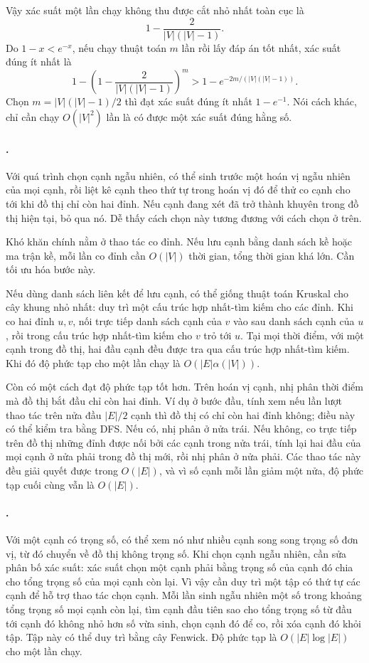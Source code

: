 \documentclass[11pt]{article}
\begin{document}
Vậy xác suất một lần chạy không thu được cắt nhỏ nhất toàn cục là
\[
  1-\frac{2}{|V|(|V|-1)}.
\]
Do \(1-x<e^{-x}\), nếu chạy thuật toán \(m\) lần rồi lấy đáp án tốt nhất, xác
suất đúng ít nhất là
\[
  1-\left(1-\frac{2}{|V|(|V|-1)}\right)^m
  > 1-e^{-2m/(|V|(|V|-1))}.
\]
Chọn \(m=|V|(|V|-1)/2\) thì đạt xác suất đúng ít nhất \(1-e^{-1}\). Nói cách
khác, chỉ cần chạy \(O(|V|^2)\) lần là có được một xác suất đúng hằng số.

\paragraph{.}
Với quá trình chọn cạnh ngẫu nhiên, có thể sinh trước một hoán vị ngẫu nhiên
của mọi cạnh, rồi liệt kê cạnh theo thứ tự trong hoán vị đó để thử co cạnh
cho tới khi đồ thị chỉ còn hai đỉnh. Nếu cạnh đang xét đã trở thành khuyên
trong đồ thị hiện tại, bỏ qua nó. Dễ thấy cách chọn này tương đương với cách
chọn ở trên.

Khó khăn chính nằm ở thao tác co đỉnh. Nếu lưu cạnh bằng danh sách kề hoặc ma
trận kề, mỗi lần co đỉnh cần \(O(|V|)\) thời gian, tổng thời gian khá lớn. Cần
tối ưu hóa bước này.

Nếu dùng danh sách liên kết để lưu cạnh, có thể giống thuật toán Kruskal cho
cây khung nhỏ nhất: duy trì một cấu trúc hợp nhất-tìm kiếm cho các đỉnh. Khi
co hai đỉnh \(u,v\), nối trực tiếp danh sách cạnh của \(v\) vào sau danh sách
cạnh của \(u\), rồi trong cấu trúc hợp nhất-tìm kiếm cho \(v\) trỏ tới \(u\).
Tại mọi thời điểm, với một cạnh trong đồ thị, hai đầu cạnh đều được tra qua
cấu trúc hợp nhất-tìm kiếm. Khi đó độ phức tạp cho một lần chạy là
\(O(|E|\alpha(|V|))\).

Còn có một cách đạt độ phức tạp tốt hơn. Trên hoán vị cạnh, nhị phân thời
điểm mà đồ thị bắt đầu chỉ còn hai đỉnh. Ví dụ ở bước đầu, tính xem nếu lần
lượt thao tác trên nửa đầu \(|E|/2\) cạnh thì đồ thị có chỉ còn hai đỉnh
không; điều này có thể kiểm tra bằng DFS. Nếu có, nhị phân ở nửa trái. Nếu
không, co trực tiếp trên đồ thị những đỉnh được nối bởi các cạnh trong nửa
trái, tính lại hai đầu của mọi cạnh ở nửa phải trong đồ thị mới, rồi nhị phân
ở nửa phải. Các thao tác này đều giải quyết được trong \(O(|E|)\), và vì số
cạnh mỗi lần giảm một nửa, độ phức tạp cuối cùng vẫn là \(O(|E|)\).

\paragraph{.}
Với một cạnh có trọng số, có thể xem nó như nhiều cạnh song song trọng số đơn
vị, từ đó chuyển về đồ thị không trọng số. Khi chọn cạnh ngẫu nhiên, cần sửa
phân bố xác suất: xác suất chọn một cạnh phải bằng trọng số của cạnh đó chia
cho tổng trọng số của mọi cạnh còn lại. Vì vậy cần duy trì một tập có thứ tự
các cạnh để hỗ trợ thao tác chọn cạnh. Mỗi lần sinh ngẫu nhiên một số trong
khoảng tổng trọng số mọi cạnh còn lại, tìm cạnh đầu tiên sao cho tổng trọng
số từ đầu tới cạnh đó không nhỏ hơn số vừa sinh, chọn cạnh đó để co, rồi xóa
cạnh đó khỏi tập. Tập này có thể duy trì bằng cây Fenwick. Độ phức tạp là
\(O(|E|\log |E|)\) cho một lần chạy.
\end{document}
